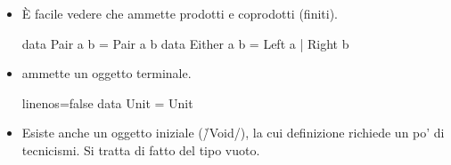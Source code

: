 \begin{frame}[fragile]
\begin{itemize}
\item È facile vedere che \Hask{} ammette prodotti e coprodotti (finiti).

\begin{haskellcode}
data Pair a b = Pair a b
data Either a b = Left a | Right b
\end{haskellcode}

\item \Hask{} ammette un oggetto terminale.

\begin{haskellcode*}{linenos=false}
data Unit = Unit
\end{haskellcode*}

\item Esiste anche un oggetto iniziale (\h/Void/), la cui definizione richiede un po' di tecnicismi. Si tratta di fatto del tipo vuoto.
\end{itemize}
\end{frame}